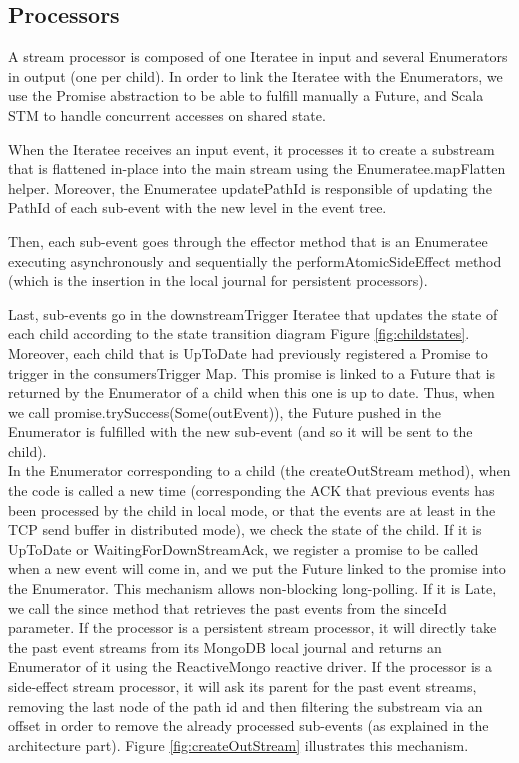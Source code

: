 \subsection{Processors}

A stream processor is composed of one Iteratee in input and several Enumerators in output (one per child). 
In order to link the Iteratee with the Enumerators, we use the Promise abstraction to be able to fulfill manually a Future, and Scala STM  to handle concurrent accesses on shared state. 

When the Iteratee receives an input event, it processes it to create a substream that is flattened in-place into the main stream using the Enumeratee.mapFlatten helper. Moreover, the Enumeratee updatePathId is responsible of updating the PathId of each sub-event with the new level in the event tree.

Then, each sub-event goes through the effector method that is an Enumeratee executing asynchronously and sequentially the performAtomicSideEffect method (which is the insertion
in the local journal for persistent processors).

Last, sub-events go in the downstreamTrigger Iteratee that updates the state of each child according to the state transition diagram Figure \ref{fig:childstates}. Moreover, each
child that is UpToDate had previously registered a Promise to trigger in the consumersTrigger Map. This promise is linked to a Future that is returned by the Enumerator of a child
when this one is up to date. Thus, when we call promise.trySuccess(Some(outEvent)), the Future pushed in the Enumerator is fulfilled with the new sub-event (and so it will be sent
to the child).
\\

In the Enumerator corresponding to a child (the createOutStream method), when the code is called a new time (corresponding the ACK that previous events has been processed by the child in local mode,
or that the events are at least in the TCP send buffer in distributed mode), we check the state of the child. If it is UpToDate or WaitingForDownStreamAck, we register
a promise to be called when a new event will come in, and we put the Future linked to the promise into the Enumerator. This mechanism allows non-blocking long-polling.
If it is Late, we call the since method that retrieves the past events from the sinceId parameter. If the processor is a persistent stream processor,
it will directly take the past event streams from its MongoDB local journal and returns an Enumerator of it using the ReactiveMongo reactive driver. If the processor is
a side-effect stream processor, it will ask its parent for the past event streams, removing the last node of the path id and then filtering the substream via an offset in order to remove the already processed sub-events (as explained in the architecture part). 
Figure \ref{fig:createOutStream} illustrates this mechanism. 

